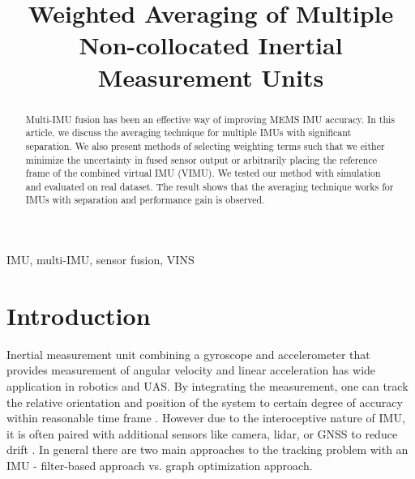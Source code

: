 \documentclass[conference]{IEEEtran}
\begin{document}
\title{Weighted Averaging of Multiple Non-collocated Inertial Measurement Units}

\author{
\and
{}
}

\maketitle

\begin{abstract}
Multi-IMU fusion has been an effective way of improving MEMS IMU accuracy. In this article, we discuss the averaging technique for multiple IMUs with significant separation. We also present methods of selecting weighting terms such that we either minimize the uncertainty in fused sensor output or arbitrarily placing the reference frame of the combined virtual IMU (VIMU). We tested our method with simulation and evaluated on real dataset. The result shows that the averaging technique works for IMUs with separation and performance gain is observed.
\end{abstract}

\begin{IEEEkeywords}
IMU, multi-IMU, sensor fusion, VINS
\end{IEEEkeywords}

\section{Introduction}

Inertial measurement unit combining a gyroscope and accelerometer that provides measurement of angular velocity and linear acceleration has wide application in robotics and UAS. By integrating the measurement, one can track the relative orientation and position of the system to certain degree of accuracy within reasonable time frame \cite{tang2022_preintegration}. However due to the interoceptive nature of IMU, it is often paired with additional sensors like camera, lidar, or GNSS to reduce drift \cite{alaba2024_gps_and_imu, shan2020_liosam, he2020_visual_imu_and_gps}. In general there are two main approaches to the tracking problem with an IMU - filter-based approach vs. graph optimization approach.
\end{document}
